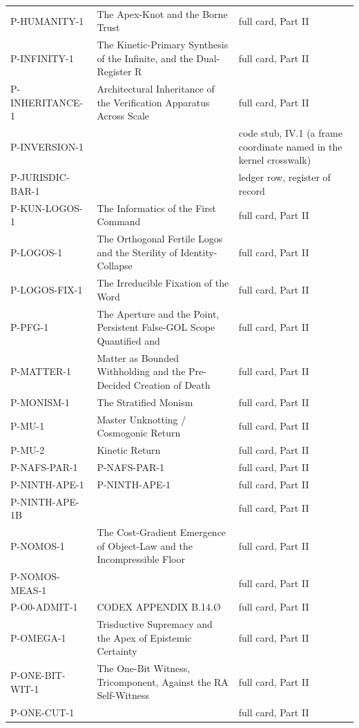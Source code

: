 \documentclass[10pt,twocolumn]{article}
\begin{document}
\begin{center}
\begin{longtable}{>{\raggedright\arraybackslash}p{}>{\raggedright\arraybackslash}p{}>{\raggedright\arraybackslash}p{}}
P-HUMANITY-1 & The Apex-Knot and the Borne Trust & full card, Part II \\
P-INFINITY-1 & The Kinetic-Primary Synthesis of the Infinite, and the Dual-Register R & full card, Part II \\
P-INHERITANCE-1 & Architectural Inheritance of the Verification Apparatus Across Scale & full card, Part II \\
P-INVERSION-1 &  & code stub, IV.1 (a frame coordinate named in the kernel crosswalk) \\
P-JURISDIC-BAR-1 &  & ledger row, register of record \\
P-KUN-LOGOS-1 & The Informatics of the First Command & full card, Part II \\
P-LOGOS-1 & The Orthogonal Fertile Logos and the Sterility of Identity-Collapse & full card, Part II \\
P-LOGOS-FIX-1 & The Irreducible Fixation of the Word & full card, Part II \\
P-PFG-1 & The Aperture and the Point, Persistent False-GOL Scope Quantified and & full card, Part II \\
P-MATTER-1 & Matter as Bounded Withholding and the Pre-Decided Creation of Death & full card, Part II \\
P-MONISM-1 & The Stratified Monism & full card, Part II \\
P-MU-1 & Master Unknotting / Cosmogonic Return & full card, Part II \\
P-MU-2 & Kinetic Return & full card, Part II \\
P-NAFS-PAR-1 & [codex home: §IV/§XVIII] P-NAFS-PAR-1 & full card, Part II \\
P-NINTH-APE-1 & [codex home: §IV/§XVIII] P-NINTH-APE-1 & full card, Part II \\
P-NINTH-APE-1B &  & full card, Part II \\
P-NOMOS-1 & The Cost-Gradient Emergence of Object-Law and the Incompressible Floor & full card, Part II \\
P-NOMOS-MEAS-1 &  & full card, Part II \\
P-O0-ADMIT-1 & CODEX APPENDIX B.14.Ø & full card, Part II \\
P-OMEGA-1 & Trisductive Supremacy and the Apex of Epistemic Certainty & full card, Part II \\
P-ONE-BIT-WIT-1 & The One-Bit Witness, Tricomponent, Against the RA Self-Witness & full card, Part II \\
P-ONE-CUT-1 &  & full card, Part II \\

\end{longtable}
\end{center}
\end{document}
